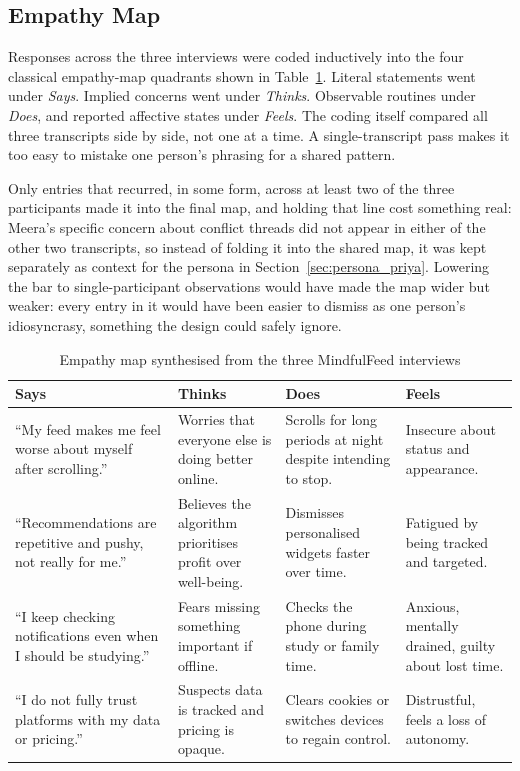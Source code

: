 \documentclass[11pt]{article}
\begin{document}
\subsection{Empathy Map}
\label{sec:empathy_map_mindfulfeed}
Responses across the three interviews were coded inductively into the four classical empathy-map quadrants shown in Table~\ref{tab:empathy_map_mindfulfeed}. Literal statements went under \textit{Says}. Implied concerns went under \textit{Thinks}. Observable routines under \textit{Does}, and reported affective states under \textit{Feels}. The coding itself compared all three transcripts side by side, not one at a time. A single-transcript pass makes it too easy to mistake one person's phrasing for a shared pattern.

Only entries that recurred, in some form, across at least two of the three participants made it into the final map, and holding that line cost something real: Meera's specific concern about conflict threads did not appear in either of the other two transcripts, so instead of folding it into the shared map, it was kept separately as context for the persona in Section~\ref{sec:persona_priya}. Lowering the bar to single-participant observations would have made the map wider but weaker: every entry in it would have been easier to dismiss as one person's idiosyncrasy, something the design could safely ignore.

\begin{table}[h]
\centering
\caption{Empathy map synthesised from the three MindfulFeed interviews}
\label{tab:empathy_map_mindfulfeed}
\small
\begin{tabular}{p{4cm} p{4cm} p{4cm} p{4cm}}
\hline
\textbf{Says} & \textbf{Thinks} & \textbf{Does} & \textbf{Feels} \\
\hline
``My feed makes me feel worse about myself after scrolling.'' & Worries that everyone else is doing better online. & Scrolls for long periods at night despite intending to stop. & Insecure about status and appearance. \\
``Recommendations are repetitive and pushy, not really for me.'' & Believes the algorithm prioritises profit over well-being. & Dismisses personalised widgets faster over time. & Fatigued by being tracked and targeted. \\
``I keep checking notifications even when I should be studying.'' & Fears missing something important if offline. & Checks the phone during study or family time. & Anxious, mentally drained, guilty about lost time. \\
``I do not fully trust platforms with my data or pricing.'' & Suspects data is tracked and pricing is opaque. & Clears cookies or switches devices to regain control. & Distrustful, feels a loss of autonomy. \\
\hline
\end{tabular}
\end{table}
\end{document}
